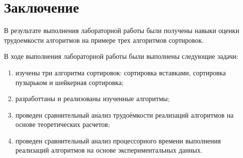 \chapter*{Заключение}

В результате выполнения лабораторной работы были получены навыки оценки трудоемкости алгоритмов на примере трех алгоритмов сортировок.

В ходе выполнения лабораторной работы были выполнены следующие задачи: 
\begin{enumerate}[label={\arabic*)}]
	\item изучены три алгоритма сортировок: сортировка вставками, сортировка пузырьком и шейкерная сортировка;
	\item разработтаны и реализованы изученные алгоритмы;
	\item проведен сравнительный анализ трудоёмкости реализаций алгоритмов на основе теоретических расчетов;
	\item проведен сравнительный анализ процессорного времени выполнения реализаций алгоритмов на основе экспериментальных данных.
\end{enumerate}


